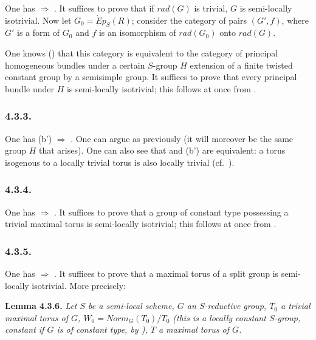 One has  \(\Rightarrow\) . It suffices to prove that if \(rad(G)\) is trivial, \(G\) is semi-locally isotrivial. Now let \(G_{0} =
\acute{E}p_{S}(R)\); consider the category of pairs \((G',f)\), where \(G'\) is a form of \(G_0\) and \(f\) is an isomorphism of
\(rad(G_{0})\) onto \(rad(G)\).

One knows () that this category is equivalent to the category of principal homogeneous bundles under a certain
\(S\)-group \(H\) extension of a finite twisted constant group by a semisimple group. It suffices to prove that every
principal bundle under \(H\) is semi-locally isotrivial; this follows at once from .

\subsubsection*{4.3.3.}

One has (b') \(\Rightarrow\) . One can argue as previously (it will moreover be the same group \(H\) that arises). One can also see
that  and (b') are equivalent: a torus isogenous to a locally trivial torus is also locally trivial (cf.~).

\subsubsection*{4.3.4.}

One has  \(\Rightarrow\) . It suffices to prove that a group of constant type possessing a trivial maximal torus is semi-locally
isotrivial; this follows at once from .

\subsubsection*{4.3.5.}

One has  \(\Rightarrow\) . It suffices to prove that a maximal torus of a split group is semi-locally isotrivial. More
precisely:

\textbf{Lemma 4.3.6.} \emph{Let \(S\) be a semi-local scheme, \(G\) an \(S\)-reductive group, \(T_0\) a trivial maximal torus of \(G\), \(W_{0}
= Norm_{G}(T_{0}) / T_{0}\) (this is a locally constant \(S\)-group, constant if \(G\) is of constant type, by ), \(T\) a
maximal torus of \(G\).}

